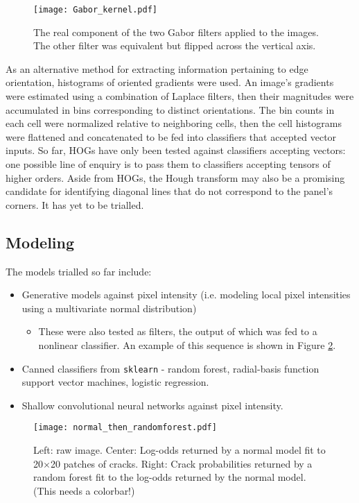 \documentclass[11pt]{article} %
\begin{document}
\begin{figure}
\centering
\texttt{[image: Gabor\_kernel.pdf]}
\caption{The real component of the two Gabor filters applied to the images. The other filter was equivalent but flipped across the vertical axis.}
\label{fig:Gabor_kernel}
\end{figure}

As an alternative method for extracting information pertaining to edge orientation, histograms of oriented gradients were used. An image's gradients were estimated using a combination of Laplace filters, then their magnitudes were accumulated in bins corresponding to distinct orientations. The bin counts in each cell were normalized relative to neighboring cells, then the cell histograms were flattened and concatenated to be fed into classifiers that accepted vector inputs. So far, HOGs have only been tested against classifiers accepting vectors: one possible line of enquiry is to pass them to classifiers accepting tensors of higher orders. Aside from HOGs, the Hough transform may also be a promising candidate for identifying diagonal lines that do not correspond to the panel's corners. It has yet to be trialled.


\subsection{Modeling}
The models trialled so far include:
\begin{itemize}
	\item Generative models against pixel intensity (i.e. modeling local pixel intensities using a multivariate normal distribution)
	\begin{itemize}
		\item These were also tested as filters, the output of which was fed to a nonlinear classifier. An example of this sequence is shown in Figure \ref{fig:normal_then_randomforest}.
	\end{itemize}
	\item Canned classifiers from \texttt{sklearn} - random forest, radial-basis function support vector machines, logistic regression.
	\item Shallow convolutional neural networks against pixel intensity.
\end{itemize}

\begin{figure}[h!]
\texttt{[image: normal\_then\_randomforest.pdf]}
\caption{Left: raw image. Center: Log-odds returned by a normal model fit to 20$\times$20 patches of cracks. Right: Crack probabilities returned by a random forest fit to the log-odds returned by the normal model. (This needs a colorbar!)}
\label{fig:normal_then_randomforest}
\end{figure} 
\end{document}
